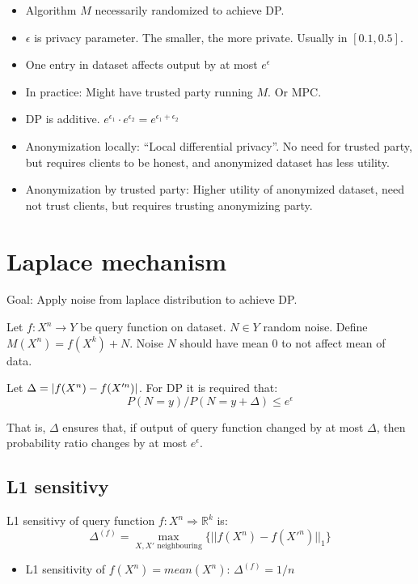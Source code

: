 \documentclass[a4paper]{scrreprt}
\DeclarePairedDelimiter\abs{\lvert}{\rvert}
\begin{document}
\begin{itemize}
		\item Algorithm $M$ necessarily randomized to achieve DP.
		\item $\epsilon$ is privacy parameter. The smaller, the more private.
				Usually in $[0.1, 0.5]$.
		\item One entry in dataset affects output by at most $e^\epsilon$
		\item In practice: Might have trusted party running $M$. Or MPC.
		\item DP is additive. $e^{\epsilon_1} \cdot e^{\epsilon_2} = e^{\epsilon_1 + \epsilon_2}$
		\item Anonymization locally: ``Local differential privacy''. No need
				for trusted party, but requires clients to be honest, and
				anonymized dataset has less utility.
		\item Anonymization by trusted party: Higher utility of anonymized
				dataset, need not trust clients, but requires trusting
				anonymizing party.
\end{itemize}


\section{Laplace mechanism}

Goal: Apply noise from laplace distribution to achieve DP.

Let $f : X^n \rightarrow Y$ be query function on dataset. $N \in Y$ random
noise. Define $M(X^n) = f(X^k) + N$. Noise $N$ should have mean $0$ to not
affect mean of data.

Let $\Delta = \abs{f(X^n) - f(X'^n)}$. For DP it is required that:
\[
		P(N = y) / P(N = y + \Delta) \leq e^\epsilon
\]

That is, $\Delta$ ensures that, if output of query function changed by at most
$\Delta$, then probability ratio changes by at most $e^\epsilon$.

\subsection{L1 sensitivy}

L1 sensitivy of query function $f : X^n \Rightarrow \mathbb{R}^k$ is:
\[
		\Delta^{(f)} = \max_{X, X' \text{ neighbouring}} \{||f(X^n) - f(X'^n)||_1\}
\]

\begin{itemize}
		\item L1 sensitivity of $f(X^n) = mean(X^n)$: $\Delta^{(f)} = 1/n$
\end{itemize}
\end{document}
